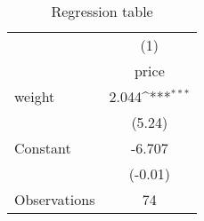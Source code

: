 \begin{table}[htbp]\centering
\def\sym#1{\ifmmode^{#1}\else\(^{#1}\)\fi}
\caption{Regression table\label{tab1}}
\begin{tabular}{l*{1}{c}}
\toprule
                    &\multicolumn{1}{c}{(1)}\\
                    &\multicolumn{1}{c}{price}\\
\midrule
weight              &       2.044\sym{***}\\
                    &      (5.24)         \\
\addlinespace
Constant            &      -6.707         \\
                    &     (-0.01)         \\
\midrule
Observations        &          74         \\
\bottomrule
\end{tabular}
\end{table}
